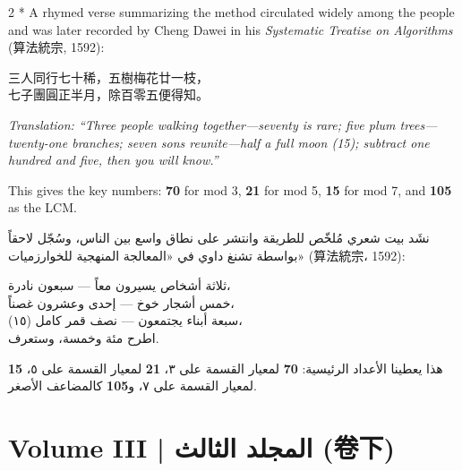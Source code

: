 \documentclass[11pt,a4paper]{article}
\newcommand{\ar}[1]{\arabicfont\beginR #1\endR}
\newcommand{\zh}[1]{{\CJKfamily{}#1}}
\begin{document}
\begin{paracol}{2}
\switchcolumn[0]*\centering
A rhymed verse summarizing the method circulated widely among the people and was later recorded by Cheng Dawei in his \textit{Systematic Treatise on Algorithms} (\zh{算法統宗}, 1592):

\begin{tcolorbox}[colback=chinesebg,colframe=rulecolor,boxrule=0.8pt,
  width=0.85\textwidth,arc=2mm]
\centering\large
\zh{三人同行七十稀，五樹梅花廿一枝，}\\[2pt]
\zh{七子團圓正半月，除百零五便得知。}
\end{tcolorbox}

\vspace{0.3cm}
\textit{Translation: ``Three people walking together---seventy is rare; five plum trees---twenty-one branches; seven sons reunite---half a full moon (15); subtract one hundred and five, then you will know.''}

\vspace{0.3cm}
This gives the key numbers: \textbf{70} for mod 3, \textbf{21} for mod 5, \textbf{15} for mod 7, and \textbf{105} as the LCM.

\switchcolumn
\centering
\ar{نشَد بيت شعري مُلخّص للطريقة وانتشر على نطاق واسع بين الناس، وسُجّل لاحقاً بواسطة تشنغ داوي في «المعالجة المنهجية للخوارزميات» (算法統宗، 1592):}

\begin{tcolorbox}[colback=arabicbg,colframe=rulecolor!70!green,boxrule=0.8pt,
  width=0.85\textwidth,arc=2mm]
\centering\large\arabicfont
\ar{ثلاثة أشخاص يسيرون معاً — سبعون نادرة،}\\[2pt]
\ar{خمس أشجار خوخ — إحدى وعشرون غصناً،}\\[2pt]
\ar{سبعة أبناء يجتمعون — نصف قمر كامل (١٥)،}\\[2pt]
\ar{اطرح مئة وخمسة، وستعرف.}
\end{tcolorbox}

\vspace{0.3cm}
\ar{هذا يعطينا الأعداد الرئيسية: \textbf{70} لمعيار القسمة على ٣، \textbf{21} لمعيار القسمة على ٥، \textbf{15} لمعيار القسمة على ٧، و\textbf{105} كالمضاعف الأصغر.}
\end{paracol}

\newpage

\section{Volume III | \ar{المجلد الثالث} (\zh{卷下})}
\end{document}
